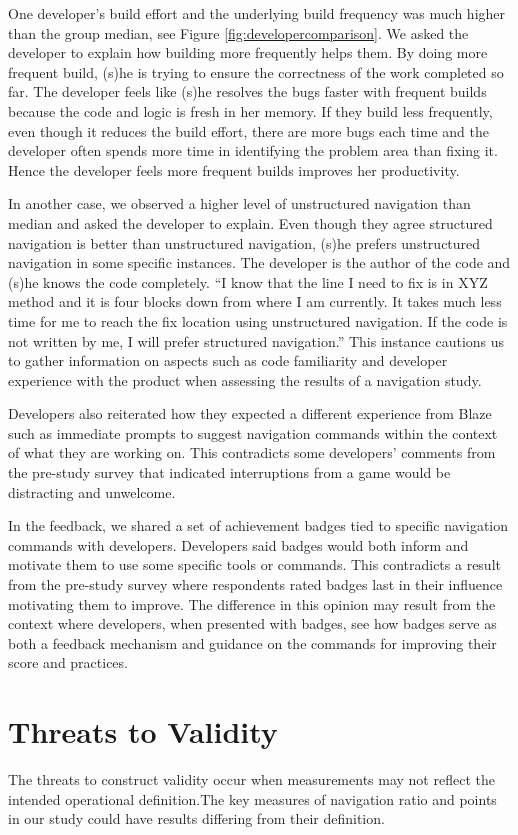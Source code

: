 \documentclass{sig-alternate}
\begin{document}
One developer's build effort and the underlying build frequency was much higher than the group median, see Figure \ref{fig:developercomparison}.  We asked the developer to explain how building more frequently helps them. By doing more frequent build, (s)he is trying to ensure the correctness of the work completed so far. The developer feels like (s)he resolves the bugs faster with frequent builds because the code and logic is fresh in her memory. If they build less frequently, even though it reduces the build effort, there are more bugs each time and the developer often spends more time in identifying the problem area than fixing it. Hence the developer feels more frequent builds improves her productivity.  

In another case, we observed a higher level of unstructured navigation than median and asked the developer to explain.  Even though they agree  structured navigation is better than unstructured navigation, (s)he prefers unstructured navigation in some specific instances. The developer is the author of the code and (s)he knows the code completely. ``I know that the line I need to fix is in XYZ method and it is four blocks down from where I am currently. It takes much less time for me to reach the fix location using unstructured navigation. If the code is not written by me, I will prefer structured navigation.'' This instance cautions us to gather information on aspects such as code familiarity and developer experience with the product when assessing the results of a navigation study.

Developers also reiterated how they expected a different experience from Blaze  such as immediate prompts to suggest navigation commands within the context of what they are working on.  This contradicts some developers' comments from the pre-study survey that indicated interruptions from a game would be distracting and unwelcome.

In the feedback, we shared a set of achievement badges tied to specific navigation commands with developers.   Developers said badges would both inform and motivate them to use some specific tools or commands.   This contradicts a result from the pre-study survey where respondents rated badges last in their influence motivating them to improve.  The difference in this opinion may result from the context where developers, when presented with badges, see how badges serve as both a feedback mechanism and guidance on the commands for improving their score and practices.

\section{Threats to Validity}
The threats to construct validity occur when measurements may not reflect the intended operational definition.The key measures of navigation ratio and points in our study could have results differing from their definition.  
\end{document}
